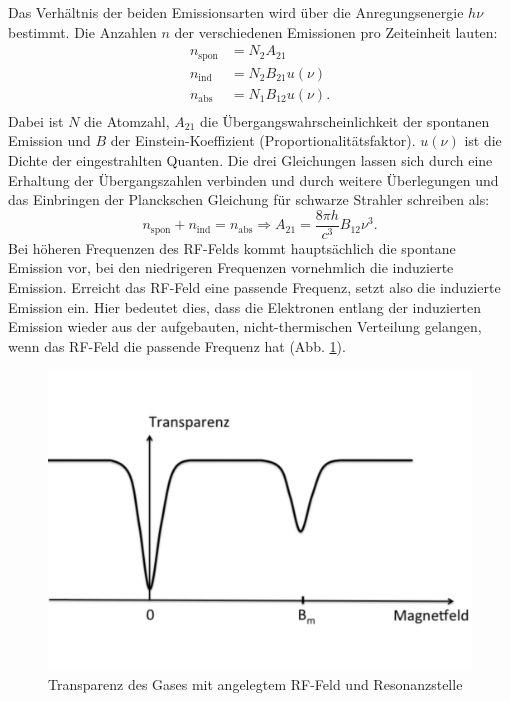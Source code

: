 Das Verhältnis der beiden Emissionsarten wird über die Anregungsenergie $h \nu$ bestimmt.
Die Anzahlen $n$ der verschiedenen Emissionen pro Zeiteinheit lauten:
\begin{align*}
n_{\text{spon}} &= N_{2} A_{21}        \\
n_{\text{ind}}  &= N_{2} B_{21} u(\nu) \\
n_{\text{abs}}  &= N_{1} B_{12} u(\nu).\\
\end{align*}
Dabei ist $N$ die Atomzahl, $A_{21}$ die Übergangswahrscheinlichkeit der spontanen Emission und $B$ der Einstein-Koeffizient (Proportionalitätsfaktor).
$u(\nu)$ ist die Dichte der eingestrahlten Quanten.
Die drei Gleichungen lassen sich durch eine Erhaltung der Übergangszahlen verbinden und durch weitere Überlegungen und das Einbringen der Planckschen Gleichung für schwarze Strahler schreiben als:
\begin{equation*}
  n_{\text{spon}} + n_{\text{ind}} = n_{\text{abs}} \Rightarrow A_{21}= \frac{8 \pi h}{c^{3}}B_{12} \nu^{3}.
\end{equation*}
Bei höheren Frequenzen des RF-Felds kommt hauptsächlich die spontane Emission vor, bei den niedrigeren Frequenzen vornehmlich die induzierte Emission.
Erreicht das RF-Feld eine passende Frequenz, setzt also die induzierte Emission ein.
Hier bedeutet dies, dass die Elektronen entlang der induzierten Emission wieder aus der aufgebauten, nicht-thermischen Verteilung gelangen, wenn das RF-Feld die passende Frequenz hat (Abb. \ref{fig:transparenz}).
\begin{figure}[h!]
  \centering
  \includegraphics[width=\textwidth]{transparenz.pdf}
  \caption{Transparenz des Gases mit angelegtem RF-Feld und Resonanzstelle \cite{1}}
  \label{fig:transparenz}
\end{figure}
